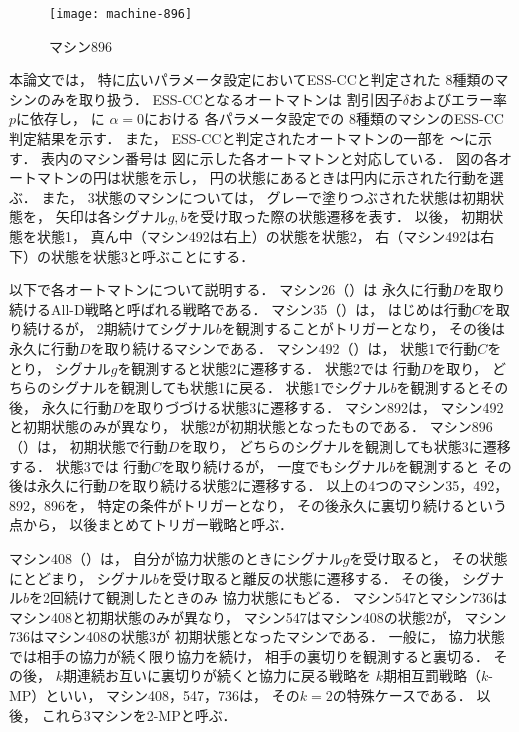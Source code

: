 \documentclass[submit]{ipsj}
\theoremstyle{definition}
\begin{document}
\begin{figure}
  \centering
  \texttt{[image: machine-896]}
  \caption{マシン896}
  \label{fig:machine-896}
\end{figure}

本論文では，
特に広いパラメータ設定においてESS-CCと判定された
8種類のマシンのみを取り扱う．
ESS-CCとなるオートマトンは
割引因子$\delta$およびエラー率$p$に依存し，
に
$\alpha = 0$における
各パラメータ設定での
8種類のマシンのESS-CC判定結果を示す．
また，
ESS-CCと判定されたオートマトンの一部を
〜に示す．
表内のマシン番号は
図に示した各オートマトンと対応している．
図の各オートマトンの円は状態を示し，
円の状態にあるときは円内に示された行動を選ぶ．
また，
3状態のマシンについては，
グレーで塗りつぶされた状態は初期状態を，
矢印は各シグナル$g, b$を受け取った際の状態遷移を表す．
以後，
初期状態を状態1，
真ん中（マシン492は右上）の状態を状態2，
右（マシン492は右下）の状態を状態3と呼ぶことにする．

以下で各オートマトンについて説明する．
マシン26（）は
永久に行動$D$を取り続けるAll-D戦略と呼ばれる戦略である．
マシン35（）は，
はじめは行動$C$を取り続けるが，
2期続けてシグナル$b$を観測することがトリガーとなり，
その後は永久に行動$D$を取り続けるマシンである．
マシン492（）は，
状態1で行動$C$をとり，
シグナル$g$を観測すると状態2に遷移する．
状態2では
行動$D$を取り，
どちらのシグナルを観測しても状態1に戻る．
状態1でシグナル$b$を観測するとその後，
永久に行動$D$を取りづづける状態3に遷移する．
マシン892は，
マシン492と初期状態のみが異なり，
状態2が初期状態となったものである．
マシン896（）は，
初期状態で行動$D$を取り，
どちらのシグナルを観測しても状態3に遷移する．
状態3では
行動$C$を取り続けるが，
一度でもシグナル$b$を観測すると
その後は永久に行動$D$を取り続ける状態2に遷移する．
以上の4つのマシン35，492，892，896を，
特定の条件がトリガーとなり，
その後永久に裏切り続けるという点から，
以後まとめてトリガー戦略と呼ぶ．

マシン408（）は，
自分が協力状態のときにシグナル$g$を受け取ると，
その状態にとどまり，
シグナル$b$を受け取ると離反の状態に遷移する．
その後，
シグナル$b$を2回続けて観測したときのみ
協力状態にもどる．
マシン547とマシン736は
マシン408と初期状態のみが異なり，
マシン547はマシン408の状態2が，
マシン736はマシン408の状態3が
初期状態となったマシンである．
一般に，
協力状態では相手の協力が続く限り協力を続け，
相手の裏切りを観測すると裏切る．
その後，
$k$期連続お互いに裏切りが続くと協力に戻る戦略を
$k$期相互罰戦略（$k$-MP）といい\cite{joyonjun-2012}，
マシン408，547，736は，
その$k = 2$の特殊ケースである．
以後，
これら3マシンを2-MPと呼ぶ．
\end{document}
